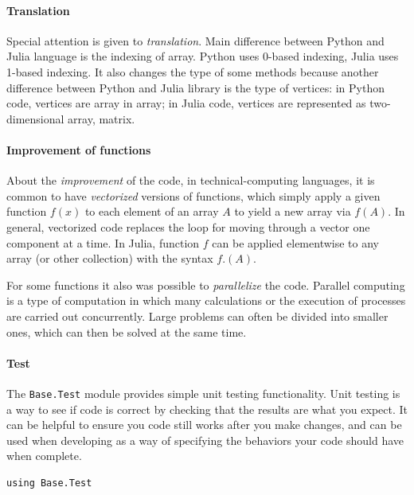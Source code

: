 \documentclass{article}
\begin{document}
\paragraph{Translation\\}
Special attention is given to \emph{translation}. Main difference between Python and Julia language is the indexing of array. Python uses 0-based indexing, Julia uses 1-based indexing. It also changes the type of some methods because another difference between Python and Julia library is the type of vertices: in Python code, vertices are array in array; in Julia code, vertices are represented as two-dimensional array, matrix.
\paragraph{Improvement of functions\\}
About the \emph{improvement} of the code, in technical-computing languages, it is common to have  \emph{vectorized} versions of functions, which simply apply a given function $f(x)$ to each element of an array $A$ to yield a new array via $f(A)$. In general, vectorized code replaces the loop for moving through a vector one component at a time. In Julia, function $f$ can be applied elementwise to any array (or other collection) with the syntax $f.(A)$.

For some functions it also was possible to \emph{parallelize} the code.
Parallel computing is a type of computation in which many calculations or the execution of processes are carried out concurrently. Large problems can often be divided into smaller ones, which can then be solved at the same time.
\paragraph{Test\\}
The \texttt{Base.Test} module provides simple unit testing functionality. Unit testing is a way to see if code is correct by checking that the results are what you expect. It can be helpful to ensure you code still works after you make changes, and can be used when developing as a way of specifying the behaviors your code should have when complete.\citep{julia}
 
\begin{flushleft}\small
\begin{list}{}{}\item
\begin{Verbatim}[tabsize=4]
using Base.Test
\end{Verbatim}
\end{list}
\end{flushleft}
\end{document}
